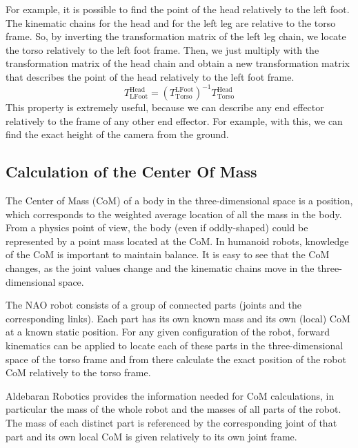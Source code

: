 For example, it is possible to find the point of the head relatively to the left foot. The kinematic chains for the head and for the left leg are relative to the torso frame. So, by inverting the transformation matrix of the left leg chain, we locate the torso relatively to the left foot frame. Then, we just multiply with the transformation matrix of the head chain and obtain a new transformation matrix that describes the point of the head relatively to the left foot frame.
\[
T^\text{Head}_\text{LFoot} = {\left(T^\text{LFoot}_\text{Torso}\right)}^{-1}T^\text{Head}_\text{Torso}
\]
This property is extremely useful, because we can describe any end effector relatively to the frame of any other end effector. For example, with this, we can find the exact height of the camera from the ground.

\subsection{Calculation of the Center Of Mass}
The Center of Mass (CoM) of a body in the three-dimensional space is a position, which corresponds to the weighted average location of all the mass in the body. From a physics point of view, the body (even if oddly-shaped) could be represented by a point mass located at the CoM. In humanoid robots, knowledge of the CoM is important to maintain balance. It is easy to see that the CoM changes, as the joint values change and the kinematic chains move in the three-dimensional space. 

The NAO robot consists of a group of connected parts (joints and the corresponding links). Each part has its own known mass and its own (local) CoM at a known static position. For any given configuration of the robot, forward kinematics can be applied to locate each of these parts in the three-dimensional space of the torso frame and from there calculate the exact position of the robot CoM relatively to the torso frame. 

Aldebaran Robotics provides the information needed for CoM calculations, in particular the mass of the whole robot and the masses of all parts of the robot. The mass of each distinct part is referenced by the corresponding joint of that part and its own local CoM is given relatively to its own joint frame.


